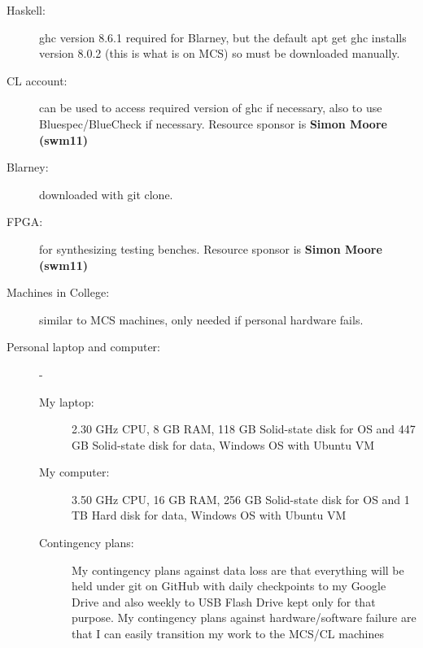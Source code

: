 \documentclass[UKenglish, 12pt]{article}
\begin{document}
\begin{description}

\item [Haskell:] ghc version 8.6.1 required for Blarney, but the default
apt get ghc installs version 8.0.2 (this is what is on MCS) so must be
downloaded manually.

\item [CL account:] can be used to access required version of ghc if necessary, also to
use Bluespec/BlueCheck if necessary. Resource sponsor is \textbf{Simon Moore (swm11)}

\item [Blarney:] downloaded with git clone.

\item [FPGA:] for synthesizing testing benches. Resource sponsor is \textbf{Simon Moore (swm11)}

\item [Machines in College:] similar to MCS machines, only needed if personal
hardware fails.

\item [Personal laptop and computer:]-

\begin{description}

\item [My laptop:] 2.30 GHz CPU, 8 GB RAM, 118 GB Solid-state disk for OS
and 447 GB Solid-state disk for data, Windows OS with Ubuntu VM

\item [My computer:] 3.50 GHz CPU, 16 GB RAM, 256 GB Solid-state disk for OS
and 1 TB Hard disk for data, Windows OS with Ubuntu VM

\item [Contingency plans:] My contingency plans against data loss are that everything
will be held under git on GitHub with daily checkpoints to
my Google Drive and also weekly to USB Flash Drive kept only for
that purpose.
My contingency plans against hardware/software failure are
that I can easily transition my work to the MCS/CL machines

\end{description}

\end{description}
\end{document}
